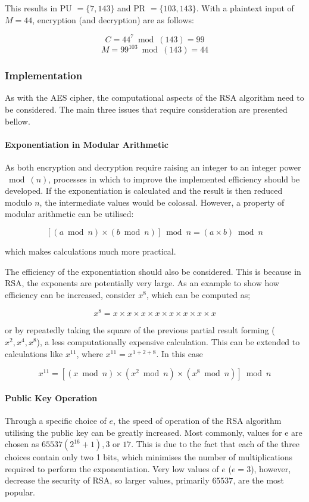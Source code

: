 \documentclass[a4paper,12pt]{report}
\begin{document}
This results in PU $= \{7,143\}$ and PR $= \{103,143\}$. With a plaintext input of $M = 44$, encryption (and decryption) are as follows:

\[ C = 44^{7} \bmod(143) = 99 \]
\[ M = 99^{103} \bmod(143) = 44 \]

\subsubsection{Implementation}

As with the AES cipher, the computational aspects of the RSA algorithm need to be considered. The main three issues that require consideration are presented bellow.

\paragraph{Exponentiation in Modular Arithmetic}

As both encryption and decryption require raising an integer to an integer power $\bmod(n)$, processes in which to improve the implemented efficiency should be developed. If the exponentiation is calculated and the result is then reduced modulo $n$, the intermediate values would be colossal. However, a property of modular arithmetic can be utilised:

\[ [(a\bmod n)\times(b \bmod n)] \bmod n = (a \times b) \bmod n \]

which makes calculations much more practical. 

The efficiency of the exponentiation should also be considered. This is because in RSA, the exponents are potentially very large. As an example to show how efficiency can be increased, consider $x^{8}$, which can be computed as;

\[ x^{8} = x \times x \times x \times x \times x \times x \times x \times x \]

or by repeatedly taking the square of the previous partial result forming ($x^2,x^4,x^8$), a less computationally expensive calculation. This can be extended to calculations like $x^{11}$, where $x^{11} = x^{1+2+8}$. In this case

\[ x^{11} = [(x \bmod n) \times (x^2 \bmod n) \times (x^8 \bmod n)] \bmod n \]

\paragraph{Public Key Operation}

Through a specific choice of $e$, the speed of operation of the RSA algorithm utilising the public key can be greatly increased. Most commonly, values for e are chosen as $65537 (2^{16} + 1), 3$ or $17$. This is due to the fact that each of the three choices contain only two 1 bits, which minimises the number of multiplications required to perform the exponentiation. Very low values of $e$ ($e = 3$), however, decrease the security of RSA, so larger values, primarily $65537$, are the most popular. 
\end{document}
